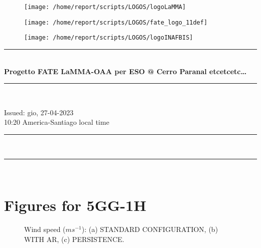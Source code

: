 \documentclass[11pt,english]{article}
\newcommand{\HRule}{\rule{\linewidth}{0.5mm}}
\begin{document}
\begin{figure}
\begin{center}
\hspace{1.5cm}
\parbox{5.5cm}{\texttt{[image: /home/report/scripts/LOGOS/logoLaMMA]}}
\hspace{.3cm}
\parbox{5.5cm}{\texttt{[image: /home/report/scripts/LOGOS/fate\_logo\_11def]}}
\hspace{.3cm}
\parbox{5.5cm}{\texttt{[image: /home/report/scripts/LOGOS/logoINAFBIS]}}
\hspace{.1cm}
\vspace{1.2cm}
\end{center}
\end{figure}

\begin{center}
\HRule \\[0.4cm]
\Huge{\textbf{Progetto FATE LaMMA-OAA per ESO @ Cerro Paranal etcetcetc\ldots}}
\HRule \\[0.4cm]
\end{center}

\begin{center}
\vspace{2cm}\Huge{Issued: gio, 27-04-2023\\ 10:20 America-Santiago local time}
\end{center}

\begin{center}
\HRule \\[0.1cm]
\tableofcontents
\HRule \\[0.1cm]
\end{center}
\newpage
\clearpage
\section{Figures for 5GG-1H}

\begin{figure}
\centering
{}
\caption{Wind speed ($m s^{-1}$): (a) STANDARD CONFIGURATION, (b) WITH AR, (c) PERSISTENCE.}
\label{fig:ws}
\end{figure}
\end{document}
